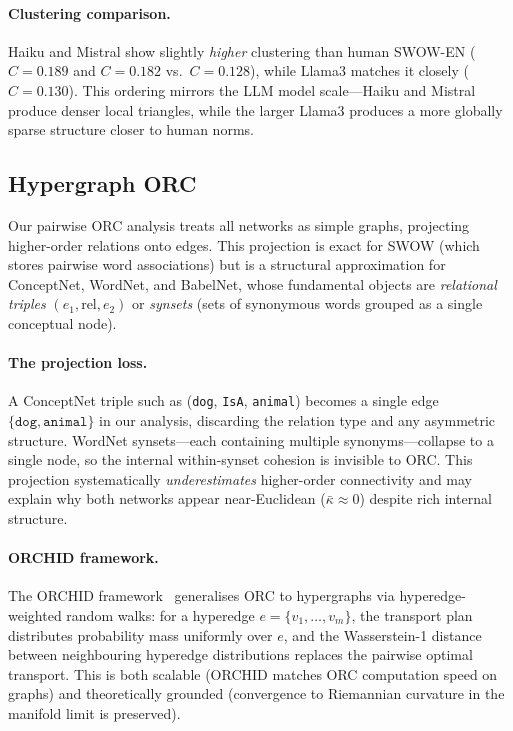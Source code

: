 \documentclass[11pt,a4paper]{article}
\newcommand{\kbar}{\bar{\kappa}}
\begin{document}
\paragraph{Clustering comparison.}
Haiku and Mistral show slightly \emph{higher} clustering than human SWOW-EN
($C=0.189$ and $C=0.182$ vs.\ $C=0.128$), while Llama3 matches it closely
($C=0.130$). This ordering mirrors the LLM model scale---Haiku and Mistral
produce denser local triangles, while the larger Llama3 produces a more globally
sparse structure closer to human norms.

\subsection{Hypergraph ORC}
\label{sec:hypergraph}

Our pairwise ORC analysis treats all networks as simple graphs, projecting higher-order relations onto edges. This projection is exact for SWOW (which stores pairwise word associations) but is a structural approximation for ConceptNet, WordNet, and BabelNet, whose fundamental objects are \emph{relational triples} $(e_1, \mathrm{rel}, e_2)$ or \emph{synsets} (sets of synonymous words grouped as a single conceptual node).

\paragraph{The projection loss.}
A ConceptNet triple such as (\texttt{dog}, \texttt{IsA}, \texttt{animal}) becomes a single edge $\{\texttt{dog}, \texttt{animal}\}$ in our analysis, discarding the relation type and any asymmetric structure. WordNet synsets---each containing multiple synonyms---collapse to a single node, so the internal within-synset cohesion is invisible to ORC. This projection systematically \emph{underestimates} higher-order connectivity and may explain why both networks appear near-Euclidean ($\kbar \approx 0$) despite rich internal structure.

\paragraph{ORCHID framework.}
The ORCHID framework~\cite{leal2023orchid} generalises ORC to hypergraphs via hyperedge-weighted random walks: for a hyperedge $e = \{v_1,\ldots,v_m\}$, the transport plan distributes probability mass uniformly over $e$, and the Wasserstein-1 distance between neighbouring hyperedge distributions replaces the pairwise optimal transport. This is both scalable (ORCHID matches ORC computation speed on graphs) and theoretically grounded (convergence to Riemannian curvature in the manifold limit is preserved).
\end{document}
